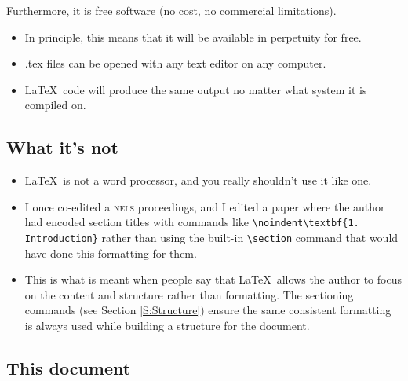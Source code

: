 \documentclass[11pt, letterpaper]{article}
\begin{document}
    \noindent Furthermore, it is free software (no cost, no commercial limitations).
    
      \begin{itemize}
	\item In principle, this means that it will be available in perpetuity for free.
	\item .tex files can be opened with any text editor on any computer.
        \item \LaTeX\ code will produce the same output no matter what system it is compiled on.
      \end{itemize}


  \subsection{What it's not}
  
    \begin{itemize}

      \item \LaTeX\ is not a word processor, and you really shouldn't use it like one.
      
      
	    \item I once co-edited a \textsc{nels} proceedings, and I edited a paper where the author had encoded section titles with commands like \verb|\noindent\textbf{1. Introduction}| rather than using the built-in \verb|\section| command that would have done this formatting for them.
	    
	    \item This is what is meant when people say that \LaTeX\ allows the author to focus on the content and structure rather than formatting. The sectioning commands (see Section \ref{S:Structure}) ensure the same consistent formatting is always used while building a structure for the document.
      
      
    \end{itemize}

  \subsection{This document}
  
\end{document}
